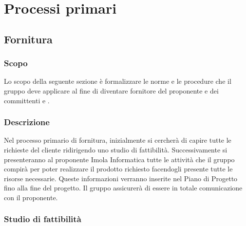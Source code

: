 \section{Processi primari}
\subsection{Fornitura}
\subsubsection{Scopo}
Lo scopo della seguente sezione è formalizzare le norme e le procedure che il gruppo \Gruppo{} deve applicare al fine di diventare fornitore del proponente \Proponente{} e dei committenti \VT{} e \CR{}.


\subsubsection{Descrizione} 
Nel processo primario di fornitura, inizialmente si cercherà di capire tutte le richieste del cliente ridirigendo uno studio di fattibilità. 
Successivamente si presenteranno al proponente Imola Informatica tutte le attività che il gruppo \Gruppo{} compirà per poter realizzare il prodotto richiesto facendogli presente tutte le risorse necessarie. Queste informazioni verranno inserite nel Piano di Progetto fino alla fine del progetto.
Il gruppo \Gruppo{} assicurerà di essere in totale comunicazione con il proponente.


\subsubsection{Studio di fattibilità}

